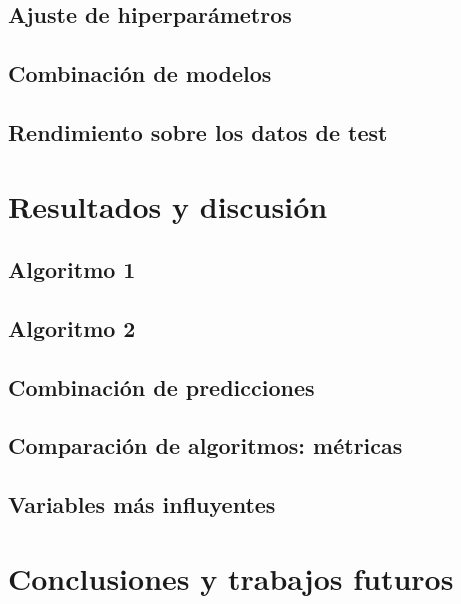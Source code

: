 \documentclass[11pt,a4paper]{article}
\begin{document}
\subsection{Ajuste de hiperparámetros}
\subsection{Combinación de modelos}
\subsection{Rendimiento sobre los datos de test}

\section{Resultados y discusión}
\subsection{Algoritmo 1}
\subsection{Algoritmo 2}
\subsection{Combinación de predicciones}
\subsection{Comparación de algoritmos: métricas}
\subsection{Variables más influyentes}

\section{Conclusiones y trabajos futuros}





\end{document}
